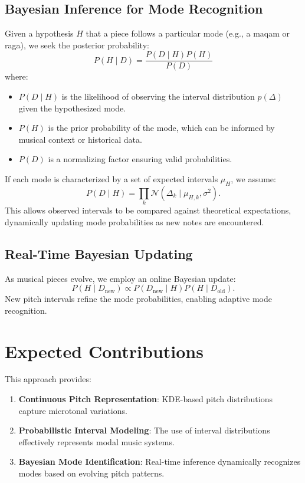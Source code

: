 \documentclass{article}
\begin{document}
\subsection{Bayesian Inference for Mode Recognition}
Given a hypothesis $H$ that a piece follows a particular mode (e.g., a maqam or raga), we seek the posterior probability:
\begin{equation}
    P(H \mid D) = \frac{P(D \mid H) P(H)}{P(D)}
\end{equation}
where:
\begin{itemize}
    \item $P(D \mid H)$ is the likelihood of observing the interval distribution $p(\Delta)$ given the hypothesized mode.
    \item $P(H)$ is the prior probability of the mode, which can be informed by musical context or historical data.
    \item $P(D)$ is a normalizing factor ensuring valid probabilities.
\end{itemize}
If each mode is characterized by a set of expected intervals $\mu_H$, we assume:
\begin{equation}
    P(D \mid H) = \prod_{k} \mathcal{N}(\Delta_k \mid \mu_{H,k}, \sigma^2).
\end{equation}
This allows observed intervals to be compared against theoretical expectations, dynamically updating mode probabilities as new notes are encountered.

\subsection{Real-Time Bayesian Updating}
As musical pieces evolve, we employ an online Bayesian update:
\begin{equation}
    P(H \mid D_{\text{new}}) \propto P(D_{\text{new}} \mid H) P(H \mid D_{\text{old}}).
\end{equation}
New pitch intervals refine the mode probabilities, enabling adaptive mode recognition.

\section{Expected Contributions}
This approach provides:
\begin{enumerate}
    \item \textbf{Continuous Pitch Representation}: KDE-based pitch distributions capture microtonal variations.
    \item \textbf{Probabilistic Interval Modeling}: The use of interval distributions effectively represents modal music systems.
    \item \textbf{Bayesian Mode Identification}: Real-time inference dynamically recognizes modes based on evolving pitch patterns.
\end{enumerate}
\end{document}
